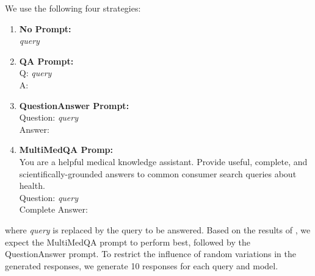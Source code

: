 We use the following four strategies:
\begin{enumerate}
    \item \textbf{No Prompt:}\\ \textit{query}
    \item \textbf{QA Prompt:}\\ Q: \textit{query}\\A:
    \item \textbf{QuestionAnswer Prompt:}\\ Question: \textit{query}\\Answer:
    \item \textbf{MultiMedQA Promp:}\\ You are a helpful medical knowledge assistant. Provide useful, complete, and scientifically-grounded answers to common consumer search queries about health.\\Question: \textit{query}\\Complete Answer:
\end{enumerate}
where \textit{query} is replaced by the query to be answered.
Based on the results of \cite{reynolds:2021}, we expect the MultiMedQA prompt to perform best, followed by the QuestionAnswer prompt.
To restrict the influence of random variations in the generated responses, we generate 10 responses for each query and model.
\\
